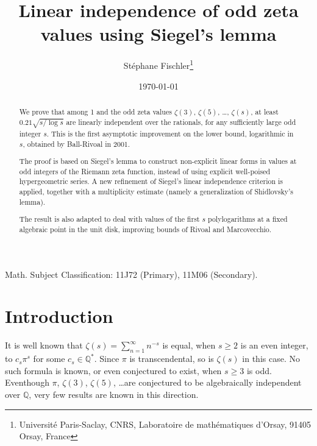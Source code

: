 \documentclass[12pt]{article}
\title{Linear independence of odd zeta values using Siegel's lemma}
\author{St\'ephane Fischler\footnote{Universit\'e Paris-Saclay, CNRS, Laboratoire de math\'ematiques d'Orsay, 91405 Orsay, France}}
\date{\today}
\numberwithin{equation}{section}
\newcommand{\Q}{\mathbb{Q}}
\newcommand{\etoile}{^\ast}
\begin{document}
\maketitle 


\begin{abstract}
We prove that among 1 and the odd zeta values $\zeta(3)$, $\zeta(5)$, \ldots, $\zeta(s)$, at least $ 0.21 \sqrt{s / \log s}$ are linearly independent over the rationals, for any sufficiently large odd integer $s$. This is the first asymptotic improvement on the lower bound, logarithmic in $s$, obtained by Ball-Rivoal in 2001.

The proof is based on Siegel's lemma to construct non-explicit linear forms in values at odd integers of the Riemann zeta function, instead of using explicit well-poised hypergeometric series. A new refinement of Siegel's linear independence criterion  is applied, together with a multiplicity estimate (namely a generalization of Shidlovsky's lemma).

The result is also adapted to deal with values of the first $s$ polylogarithms at a fixed algebraic point in the unit disk, improving bounds of Rivoal and Marcovecchio.
\end{abstract}

\bigskip

\noindent Math. Subject Classification: 11J72 (Primary), 11M06 (Secondary).


\bigskip

\section{Introduction}

It is well known that $\zeta(s) = \sum_{n=1}^\infty n^{-s} $ is equal, when 
 $s\geq 2$ is an even integer, to $c_s \pi^{ s}$ for some $c_s \in\Q\etoile$. Since $\pi$ is transcendental, so is $\zeta(s) $ in this case. No such formula is known, or even conjectured to exist, when $s\geq 3$ is odd. Eventhough $\pi$, $\zeta(3)$, $\zeta(5)$, \ldots are conjectured to be algebraically independent over $\Q$, very few results are known in this direction.
 
\end{document}
